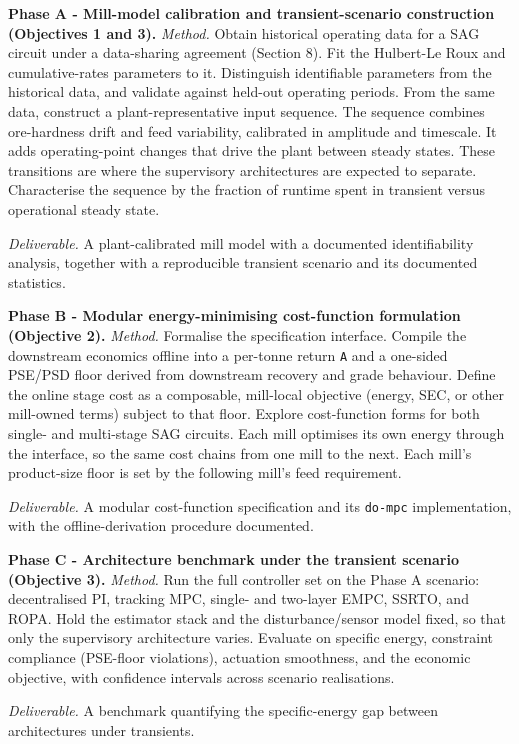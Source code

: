 \documentclass[
  14pt,
]{extarticle}
\begin{document}
\textbf{Phase A - Mill-model calibration and transient-scenario
construction (Objectives 1 and 3).} \emph{Method.} Obtain historical
operating data for a SAG circuit under a data-sharing agreement (Section
8). Fit the Hulbert-Le Roux and cumulative-rates parameters to it.
Distinguish identifiable parameters from the historical data, and
validate against held-out operating periods. From the same data,
construct a plant-representative input sequence. The sequence combines
ore-hardness drift and feed variability, calibrated in amplitude and
timescale. It adds operating-point changes that drive the plant between
steady states. These transitions are where the supervisory
architectures are expected to separate. Characterise the sequence by
the fraction of runtime spent in transient
versus operational steady state.

\emph{Deliverable.} A plant-calibrated
mill model with a documented identifiability analysis, together with a
reproducible transient scenario and its documented statistics.

\textbf{Phase B - Modular energy-minimising cost-function formulation
(Objective 2).} \emph{Method.} Formalise the specification interface.
Compile the downstream economics offline into a per-tonne return
\texttt{A} and a one-sided PSE/PSD floor derived from downstream
recovery and grade behaviour. Define the online stage cost as a
composable, mill-local objective (energy, SEC, or other mill-owned
terms) subject to that floor. Explore cost-function forms for both
single- and multi-stage SAG circuits. Each mill optimises its own energy
through the interface, so the same cost chains from one mill to the
next. Each mill's product-size floor is set by the following mill's feed
requirement.

\emph{Deliverable.} A modular cost-function specification
and its \texttt{do-mpc} implementation, with the offline-derivation
procedure documented.

\textbf{Phase C - Architecture benchmark under the transient scenario
(Objective 3).} \emph{Method.} Run the full controller set on the Phase
A scenario: decentralised PI, tracking MPC, single- and two-layer EMPC,
SSRTO, and ROPA. Hold the estimator stack and the disturbance/sensor
model fixed, so that only the supervisory architecture varies. Evaluate
on specific energy, constraint compliance (PSE-floor violations),
actuation smoothness, and the economic objective, with confidence
intervals across scenario realisations.

\emph{Deliverable.} A benchmark
quantifying the specific-energy gap between architectures under
transients.
\end{document}
